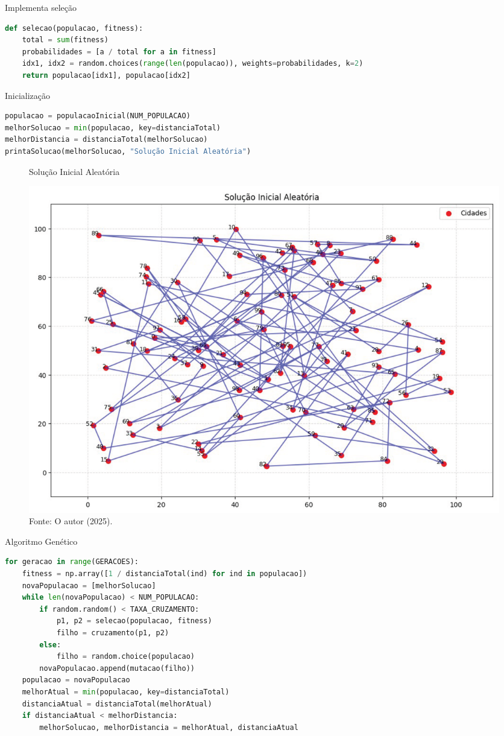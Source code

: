 Implementa seleção

\begin{lstlisting}[language=Python, style=input]
def selecao(populacao, fitness): 
    total = sum(fitness) 
    probabilidades = [a / total for a in fitness] 
    idx1, idx2 = random.choices(range(len(populacao)), weights=probabilidades, k=2) 
    return populacao[idx1], populacao[idx2]
\end{lstlisting}

Inicialização

\begin{lstlisting}[language=Python, style=input]
populacao = populacaoInicial(NUM_POPULACAO)
melhorSolucao = min(populacao, key=distanciaTotal)
melhorDistancia = distanciaTotal(melhorSolucao)
printaSolucao(melhorSolucao, "Solução Inicial Aleatória")
\end{lstlisting}

\begin{figure}[H]
\centering
\caption{Solução Inicial Aleatória}
\includegraphics[width=1\linewidth]{apendices/fig/IAA015_1.png}
\caption*{Fonte: O autor (2025).}
\end{figure}

Algoritmo Genético

\begin{lstlisting}[language=Python, style=input]
for geracao in range(GERACOES): 
    fitness = np.array([1 / distanciaTotal(ind) for ind in populacao])
    novaPopulacao = [melhorSolucao]
    while len(novaPopulacao) < NUM_POPULACAO:
        if random.random() < TAXA_CRUZAMENTO:
            p1, p2 = selecao(populacao, fitness)
            filho = cruzamento(p1, p2)
        else:
            filho = random.choice(populacao)
        novaPopulacao.append(mutacao(filho))
    populacao = novaPopulacao
    melhorAtual = min(populacao, key=distanciaTotal)
    distanciaAtual = distanciaTotal(melhorAtual)
    if distanciaAtual < melhorDistancia:
        melhorSolucao, melhorDistancia = melhorAtual, distanciaAtual
\end{lstlisting}

